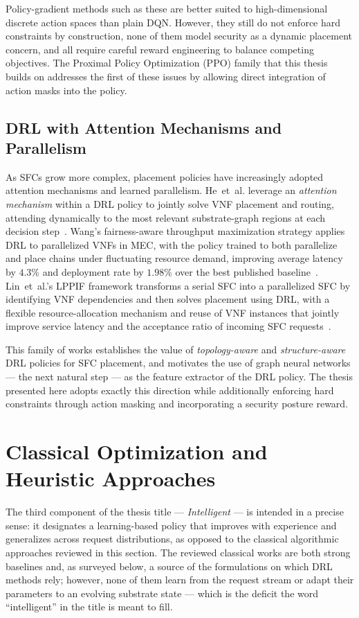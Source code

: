 Policy-gradient methods such as these are better suited to
high-dimensional discrete action spaces than plain DQN. However, they
still do not enforce hard constraints by construction, none of them
model security as a dynamic placement concern, and all require
careful reward engineering to balance competing objectives. The
Proximal Policy Optimization (PPO) family that this thesis builds on
addresses the first of these issues by allowing direct integration of
action masks into the policy.

\subsection{DRL with Attention Mechanisms and Parallelism}

As SFCs grow more complex, placement policies have increasingly
adopted attention mechanisms and learned parallelism. He~et~al.
leverage an \emph{attention mechanism} within a DRL policy to jointly
solve VNF placement and routing, attending dynamically to the most
relevant substrate-graph regions at each decision
step~\cite{he_leveraging_2023}. Wang's fairness-aware throughput
maximization strategy applies DRL to parallelized VNFs in MEC, with
the policy trained to both parallelize and place chains under
fluctuating resource demand, improving average latency by $4.3\%$ and
deployment rate by $1.98\%$ over the best published
baseline~\cite{wang_fairness-aware_2025}. Lin~et~al.'s LPPIF
framework transforms a serial SFC into a parallelized SFC by
identifying VNF dependencies and then solves placement using DRL,
with a flexible resource-allocation mechanism and reuse of VNF
instances that jointly improve service latency and the acceptance
ratio of incoming SFC requests~\cite{lin_lppif_2025}.

This family of works establishes the value of \emph{topology-aware}
and \emph{structure-aware} DRL policies for SFC placement, and
motivates the use of graph neural networks --- the next natural step
--- as the feature extractor of the DRL policy. The thesis presented
here adopts exactly this direction while additionally enforcing hard
constraints through action masking and incorporating a security
posture reward.

\section{Classical Optimization and Heuristic Approaches}
\label{sec:lr_classical}

The third component of the thesis title --- \textit{Intelligent} ---
is intended in a precise sense: it designates a learning-based
policy that improves with experience and generalizes across request
distributions, as opposed to the classical algorithmic approaches
reviewed in this section. The reviewed classical works are both strong
baselines and, as surveyed below, a source of the formulations on
which DRL methods rely; however, none of them learn from the request
stream or adapt their parameters to an evolving substrate state ---
which is the deficit the word ``intelligent'' in the title is meant to
fill.

